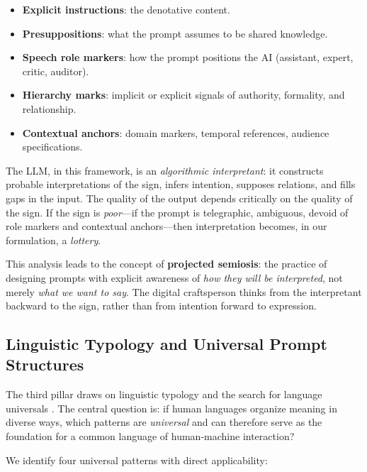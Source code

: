\documentclass[11pt,a4paper]{article}
\begin{document}
\begin{itemize}
    \item \textbf{Explicit instructions}: the denotative content.
    \item \textbf{Presuppositions}: what the prompt assumes to be shared knowledge.
    \item \textbf{Speech role markers}: how the prompt positions the AI (assistant, expert, critic, auditor).
    \item \textbf{Hierarchy marks}: implicit or explicit signals of authority, formality, and relationship.
    \item \textbf{Contextual anchors}: domain markers, temporal references, audience specifications.
\end{itemize}

The LLM, in this framework, is an \emph{algorithmic interpretant}: it constructs probable interpretations of the sign, infers intention, supposes relations, and fills gaps in the input. The quality of the output depends critically on the quality of the sign. If the sign is \emph{poor}---if the prompt is telegraphic, ambiguous, devoid of role markers and contextual anchors---then interpretation becomes, in our formulation, a \emph{lottery}.

This analysis leads to the concept of \textbf{projected semiosis}: the practice of designing prompts with explicit awareness of \emph{how they will be interpreted}, not merely \emph{what we want to say}. The digital craftsperson thinks from the interpretant backward to the sign, rather than from intention forward to expression.

\subsection{Linguistic Typology and Universal Prompt Structures}

The third pillar draws on linguistic typology and the search for language universals \citep{greenberg1963universals, comrie1989language}. The central question is: if human languages organize meaning in diverse ways, which patterns are \emph{universal} and can therefore serve as the foundation for a common language of human-machine interaction?

We identify four universal patterns with direct applicability:
\end{document}
